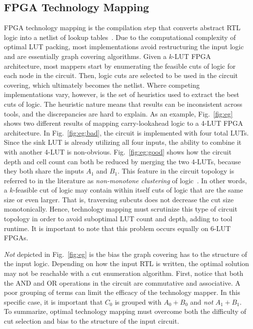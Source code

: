 \subsection{FPGA Technology Mapping}\label{sec:background:fpga}
FPGA technology mapping is the compilation step that converts abstract RTL
logic into a netlist of lookup tables~\cite{flowmap, daomap, attmap, imap,
    wiremap}. Due to the computational complexity of optimal LUT packing, most
implementations avoid restructuring the input logic and are essentially graph
covering algorithms. Given a $k$-LUT FPGA architecture, most mappers start by
enumerating the feasible cuts of logic for each node in the circuit. Then,
logic cuts are selected to be used in the circuit covering, which ultimately
becomes the netlist. Where competing implementations vary, however, is the set
of heuristics used to extract the best cuts of logic. The heuristic nature
means that results can be inconsistent across tools, and the discrepancies are
hard to explain. As an example, Fig.~\ref{fig:eg} shows two different results
of mapping carry-lookahead logic to a 4-LUT FPGA architecture. In
Fig.~\ref{fig:eg:bad}, the circuit is implemented with four total LUTs. Since
the sink LUT is already utilizing all four inputs, the ability to combine it
with another 4-LUT is non-obvious. Fig.~\ref{fig:eg:good} shows how the circuit
depth and cell count can both be reduced by merging the two 4-LUTs, because
they both share the inputs $A_1$ and $B_1$. This feature in the circuit
topology is referred to in the literature as \textit{non-monotone clustering}
of logic~\cite{flowmap}. In other words, a $k$-feasible cut of logic may
contain within itself cuts of logic that are the same size or even larger. That
is, traversing subcuts does not decrease the cut size monotonically. Hence,
technology mapping must scrutinize this type of circuit topology in order to
avoid suboptimal LUT count and depth, adding to tool runtime. It is important
to note that this problem occurs equally on 6-LUT FPGAs.

\textit{Not} depicted in Fig.~\ref{fig:eg} is the bias the graph
covering has to the structure of the input logic. Depending on how the input
RTL is written, the optimal solution may not be reachable with a cut
enumeration algorithm. First, notice that both the AND and OR operations in the
circuit are commutative and associative. A poor grouping of terms can limit the
efficacy of the technology mapper. In this specific case, it is important that
$C_0$ is grouped with $A_0 + B_0$ and \textit{not} $A_1 + B_1$. To summarize,
optimal technology mapping must overcome both the difficulty of cut selection
and bias to the structure of the input circuit.

